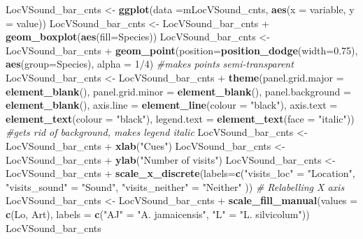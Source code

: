 \documentclass[]{article}
\newenvironment{Shaded}{\begin{snugshade}}{\end{snugshade}}
\newcommand{\KeywordTok}[1]{\textcolor[rgb]{0.13,0.29,0.53}{\textbf{{#1}}}}
\newcommand{\DataTypeTok}[1]{\textcolor[rgb]{0.13,0.29,0.53}{{#1}}}
\newcommand{\DecValTok}[1]{\textcolor[rgb]{0.00,0.00,0.81}{{#1}}}
\newcommand{\FloatTok}[1]{\textcolor[rgb]{0.00,0.00,0.81}{{#1}}}
\newcommand{\StringTok}[1]{\textcolor[rgb]{0.31,0.60,0.02}{{#1}}}
\newcommand{\CommentTok}[1]{\textcolor[rgb]{0.56,0.35,0.01}{\textit{{#1}}}}
\newcommand{\NormalTok}[1]{{#1}}
\begin{document}
\begin{Shaded}
\begin{Highlighting}[]
\NormalTok{LocVSound_bar_cnts <-}\StringTok{ }\KeywordTok{ggplot}\NormalTok{(}\DataTypeTok{data =}\NormalTok{mLocVSound_cnts, }\KeywordTok{aes}\NormalTok{(}\DataTypeTok{x =} \NormalTok{variable, }\DataTypeTok{y =} \NormalTok{value))}
\NormalTok{LocVSound_bar_cnts <-}\StringTok{ }\NormalTok{LocVSound_bar_cnts +}\StringTok{ }\KeywordTok{geom_boxplot}\NormalTok{(}\KeywordTok{aes}\NormalTok{(}\DataTypeTok{fill=}\NormalTok{Species))}
\NormalTok{LocVSound_bar_cnts <-}\StringTok{ }\NormalTok{LocVSound_bar_cnts +}\StringTok{ }\KeywordTok{geom_point}\NormalTok{(}\DataTypeTok{position=}\KeywordTok{position_dodge}\NormalTok{(}\DataTypeTok{width=}\FloatTok{0.75}\NormalTok{), }\KeywordTok{aes}\NormalTok{(}\DataTypeTok{group=}\NormalTok{Species), }\DataTypeTok{alpha =} \DecValTok{1}\NormalTok{/}\DecValTok{4}\NormalTok{) }\CommentTok{#makes points semi-transparent}
\NormalTok{LocVSound_bar_cnts <-}\StringTok{ }\NormalTok{LocVSound_bar_cnts +}\StringTok{ }\KeywordTok{theme}\NormalTok{(}\DataTypeTok{panel.grid.major =} \KeywordTok{element_blank}\NormalTok{(), }\DataTypeTok{panel.grid.minor =} \KeywordTok{element_blank}\NormalTok{(),}
\DataTypeTok{panel.background =} \KeywordTok{element_blank}\NormalTok{(), }\DataTypeTok{axis.line =} \KeywordTok{element_line}\NormalTok{(}\DataTypeTok{colour =} \StringTok{"black"}\NormalTok{), }\DataTypeTok{axis.text =} \KeywordTok{element_text}\NormalTok{(}\DataTypeTok{colour =} \StringTok{"black"}\NormalTok{), }\DataTypeTok{legend.text =} \KeywordTok{element_text}\NormalTok{(}\DataTypeTok{face =} \StringTok{"italic"}\NormalTok{))  }\CommentTok{#gets rid of background, makes legend italic}
\NormalTok{LocVSound_bar_cnts <-}\StringTok{ }\NormalTok{LocVSound_bar_cnts +}\StringTok{ }\KeywordTok{xlab}\NormalTok{(}\StringTok{"Cues"}\NormalTok{)}
\NormalTok{LocVSound_bar_cnts <-}\StringTok{ }\NormalTok{LocVSound_bar_cnts +}\StringTok{ }\KeywordTok{ylab}\NormalTok{(}\StringTok{"Number of visits"}\NormalTok{)}
\NormalTok{LocVSound_bar_cnts <-}\StringTok{ }\NormalTok{LocVSound_bar_cnts +}\StringTok{ }\KeywordTok{scale_x_discrete}\NormalTok{(}\DataTypeTok{labels=}\KeywordTok{c}\NormalTok{(}\StringTok{"visits_loc"} \NormalTok{=}\StringTok{ "Location"}\NormalTok{, }\StringTok{"visits_sound"} \NormalTok{=}\StringTok{ "Sound"}\NormalTok{,}
                              \StringTok{"visits_neither"} \NormalTok{=}\StringTok{ "Neither"} \NormalTok{))  }\CommentTok{# Relabelling X axis}
\NormalTok{LocVSound_bar_cnts <-}\StringTok{ }\NormalTok{LocVSound_bar_cnts +}\StringTok{ }\KeywordTok{scale_fill_manual}\NormalTok{(}\DataTypeTok{values =} \KeywordTok{c}\NormalTok{(Lo, Art), }\DataTypeTok{labels =} \KeywordTok{c}\NormalTok{(}\StringTok{"AJ"} \NormalTok{=}\StringTok{ "A. jamaicensis"}\NormalTok{, }\StringTok{"L"} \NormalTok{=}\StringTok{ "L. silvicolum"}\NormalTok{))}
\NormalTok{LocVSound_bar_cnts}
\end{Highlighting}
\end{Shaded}
\end{document}
